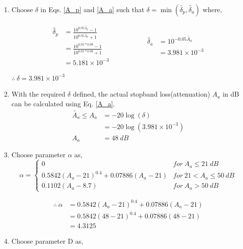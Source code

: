 \documentclass[a4paper,11pt]{article}%
\begin{document}
\begin{enumerate}[\hspace{1cm}a.)]
\item Choose $\delta$ in Eqs. \ref{A_p} and \ref{A_a} such that $\delta = \min(\tilde{\delta_p}, \tilde{\delta_a})$ where,

\[
\begin{split}
	\tilde{\delta_p} &= \frac{10^{0.05\tilde{A_p}}-1}{10^{0.05\tilde{A_p}}+1}\\
	&=\frac{10^{0.05*0.09}-1}{10^{0.05*0.09}+1}\\
	&=5.181\times10^{-3}
\end{split}
\hspace{2cm}
\begin{split}
	\tilde{\delta_a} &= 10^{-0.05\tilde{A_a}}\\
&=3.981\times10^{-3}
\end{split}
\]
\begin{center}
	$\therefore~ \delta = 3.981\times10^{-3} $
\end{center}

\item With the required $\delta$ defined, the actual stopband loss(attenuation) $A_a$ in dB can be calculated using Eq. \ref{A_a}.
\[
\begin{split}
	 \tilde{A_a} \le A_a &= -20\log(\delta)\\
	 &=-20\log(3.981\times10^{-3})\\
	A_a &= 48 ~dB
\end{split}
\]

\item Choose parameter $\alpha$ as,
    \[
\alpha = \begin{cases}
	0 & for~  A_a \leq 21 ~dB \\
	0.5842(A_a - 21)^{0.4} + 0.07886(A_a - 21) & for ~ 21 < A_a \leq 50 ~dB \\
	0.1102(A_a - 8.7) & for~  A_a > 50 ~dB
\end{cases}
\]

\[
\begin{split}
\therefore~ \alpha &= 0.5842(A_a - 21)^{0.4} + 0.07886(A_a - 21)\\
&=	0.5842(48 - 21)^{0.4} + 0.07886(48 - 21)\\
&=4.3125
\end{split}
\]

\item Choose parameter D as,


\end{enumerate}
\end{document}
